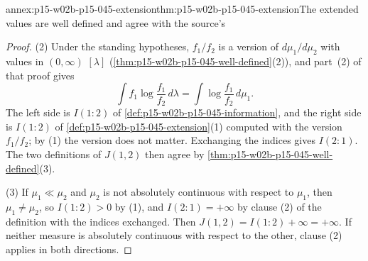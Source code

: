 \begin{annexitem}{annex:p15-w02b-p15-045-extension}{thm:p15-w02b-p15-045-extension}{The extended values are well defined and agree with the source's}
\begin{proof}
(2) Under the standing hypotheses, \(f_1/f_2\) is a version of
\(d\mu_1/d\mu_2\) with values in \((0,\infty)\) \([\lambda]\)
(\cref{thm:p15-w02b-p15-045-well-defined}(2)), and part~(2) of that
proof gives
\[
  \int f_1\log\frac{f_1}{f_2}\,d\lambda=\int\log\frac{f_1}{f_2}\,d\mu_1 .
\]
The left side is \(I(1:2)\) of \cref{def:p15-w02b-p15-045-information},
and the right side is \(I(1:2)\) of
\cref{def:p15-w02b-p15-045-extension}(1) computed with the version
\(f_1/f_2\); by (1) the version does not matter. Exchanging the indices
gives \(I(2:1)\). The two definitions of \(J(1,2)\) then agree by
\cref{thm:p15-w02b-p15-045-well-defined}(3).

(3) If \(\mu_1\ll\mu_2\) and \(\mu_2\) is not absolutely continuous with
respect to \(\mu_1\), then \(\mu_1\neq\mu_2\), so \(I(1:2)>0\) by (1),
and \(I(2:1)=+\infty\) by clause (2) of the definition with the indices
exchanged. Then \(J(1,2)=I(1:2)+\infty=+\infty\). If neither measure is
absolutely continuous with respect to the other, clause (2) applies in
both directions.
\end{proof}
\end{annexitem}

